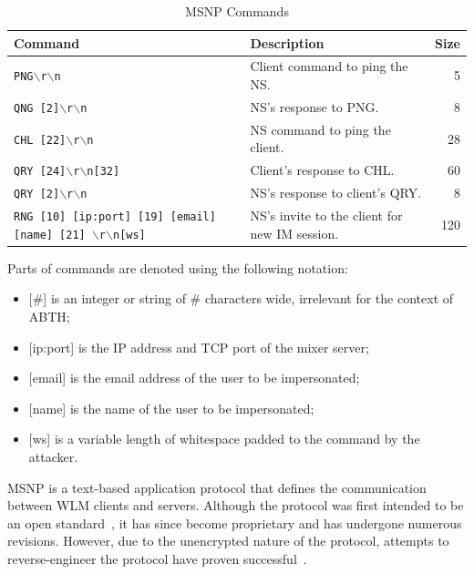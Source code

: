 \documentclass{sig-alternate}
\begin{document}
\begin{table}[tbp]
	\centering

	\caption {MSNP Commands}
	\label{tab:commandlist}

	\begin{tabular}{llr}
		\hline
		\hline
		\textbf{Command} & \textbf{Description} & \textbf{Size} \\
		\hline
		\texttt{PNG$\backslash$r$\backslash$n} & Client command to ping the NS. & 5 \\
		\texttt{QNG [2]$\backslash$r$\backslash$n} & NS's response to PNG. & 8 \\
		\texttt{CHL [22]$\backslash$r$\backslash$n} & NS command to ping the client. & 28 \\
		\texttt{QRY [24]$\backslash$r$\backslash$n[32]} & Client's response to CHL. & 60 \\
		\texttt{QRY [2]$\backslash$r$\backslash$n} & NS's response to client's QRY. & 8 \\
		\texttt{RNG [10] [ip:port] [19] [email] [name] [21] $\backslash$r$\backslash$n[ws]} & NS's invite to the client for new IM session. & 120 \\
		\hline
	\end{tabular}

	\begin{flushleft}
	Parts of commands are denoted using the following notation:

	\begin{itemize}
		\item {[\#]} is an integer or string of \# characters wide, irrelevant for the context of ABTH;
		\item {[ip:port]} is the IP address and TCP port of the mixer server;
		\item {[email]} is the email address of the user to be impersonated;
		\item {[name]} is the name of the user to be impersonated;
		\item {[ws]} is a variable length of whitespace padded to the command by the attacker.
	\end{itemize}
	\end{flushleft}
\end{table}

MSNP is a text-based application protocol that defines the communication between WLM clients and servers.
Although the protocol was first intended to be an open standard~\cite{fout:insidewlm}, it has since become proprietary and has undergone numerous revisions.
However, due to the unencrypted nature of the protocol, attempts to reverse-engineer the protocol have proven successful~\cite{hypothetic:msnp, msnfanatic:msnp}.
\end{document}
